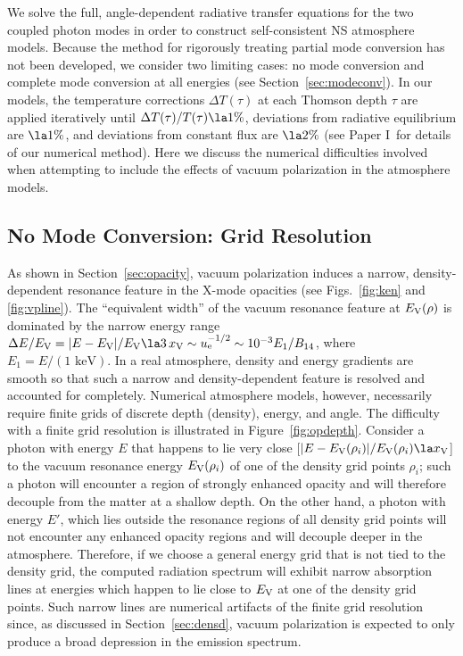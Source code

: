 \documentclass{mn2e}
\newcommand{\uel}{u_{\rm e}}
\newcommand{\Evp}{E_{\rm V}}
\newcommand{\holai}{Paper I}
\begin{document}
{We solve the full, angle-dependent radiative transfer equations
for the two coupled photon modes in order to construct self-consistent
NS atmosphere models.
Because the method for rigorously treating partial mode conversion
has not been developed, we consider two limiting cases:
no mode conversion and complete
mode conversion at all energies (see Section~\ref{sec:modeconv}).
In our models, the
temperature corrections $\Delta T(\tau)$ at each Thomson depth $\tau$
are applied iteratively until $\Delta T(\tau)/T(\tau)\la 1\%$,
deviations from radiative equilibrium are $\la 1\%$, and deviations
from constant flux are $\la 2\%$
(see \holai\ for details of our numerical method).
Here we discuss the numerical difficulties involved when attempting
to include the effects of vacuum polarization in the atmosphere models.

\subsection{No Mode Conversion: Grid Resolution}
\label{sec:grid}

As shown in Section~\ref{sec:opacity}, vacuum polarization induces
a narrow, density-dependent resonance feature in the X-mode opacities
(see Figs.~\ref{fig:ken} and \ref{fig:vpline}).
The ``equivalent width'' of the vacuum resonance feature at $\Evp(\rho)$
is dominated by the narrow energy range
$\Delta E/\Evp=|E-\Evp|/\Evp\la 3\,x_{\rm V}\sim\uel^{-1/2}
\sim 10^{-3}E_1/B_{14}$, where $E_1=E/(\mbox{1 keV})$.
In a real atmosphere, density and energy gradients
are smooth so that such a narrow and density-dependent feature
is resolved and accounted for completely.
Numerical atmosphere models, however, necessarily
require finite grids of discrete depth (density), energy, and angle.
The difficulty with a finite grid resolution is illustrated in
Figure~\ref{fig:opdepth}.
Consider a photon with energy $E$ that happens to lie very close
[$|E-\Evp(\rho_i)|/\Evp(\rho_i)\la x_{\rm V}$] to the vacuum
resonance energy $\Evp(\rho_i)$ of one of the density grid points
$\rho_i$; such a photon will encounter a region of strongly enhanced
opacity and will therefore decouple from the matter at a shallow depth.
On the other hand, a photon with energy $E'$, which lies outside
the resonance regions of all density grid points will not
encounter any enhanced opacity regions and will decouple deeper
in the atmosphere.  Therefore, if we choose a general energy
grid that is not tied to the density grid, the computed radiation
spectrum will exhibit narrow absorption lines at energies which
happen to lie close to $\Evp$ at one of the density grid points.
Such narrow lines are numerical artifacts of the finite grid
resolution since, as discussed in Section~\ref{sec:densd},
vacuum polarization is expected to only produce a broad depression
in the emission spectrum.

}
\end{document}
